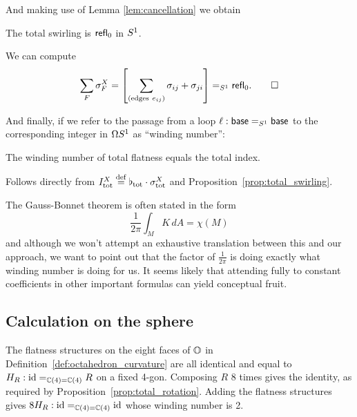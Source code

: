 And making use of Lemma \ref{lem:cancellation} we obtain
\begin{myprop}The total swirling is \( \mathsf{refl}_0 \) in \( S^1 \).\label{prop:total_swirling}
\end{myprop}
\begin{myproof}We can compute
\[\sum_F\sigma^X_F=\left[\sum_{(\mathrm{edges\ }e_{ij})}\sigma_{ij}+\sigma_{ji}\right]=_{\so}\refl_0.\qedhere\]
\end{myproof}

And finally, if we refer to the passage from a loop \( \ell:\mathsf{base}=_{S^1} \mathsf{base} \) to the corresponding integer in \( \Omega S^1 \) as ``winding number'':

\begin{mythm}\label{thm:total_index_total_curvature}The winding number of total flatness equals the total index.
\end{mythm}
\begin{myproof}
Follows directly from \( I^X_{\mathrm{tot}}\stackrel{\mathrm{def}}{=}\flat_{\mathrm{tot}}\cdot \sigma^X_{\mathrm{tot}} \) and Proposition~\ref{prop:total_swirling}.
\end{myproof}

\begin{mynote}
The Gauss-Bonnet theorem is often stated in the form \[\frac{1}{2\pi}\int_M K\,dA=\chi(M)\] and although we won't attempt an exhaustive translation between this and our approach, we want to point out that the factor of \( \frac{1}{2\pi} \) is doing exactly what winding number is doing for us. It seems likely that attending fully to constant coefficients in other important formulas can yield conceptual fruit.
\end{mynote}

\subsection{Calculation on the sphere}
The flatness structures on the eight faces of \( \mathbb{O} \) in Definition~\ref{def:octahedron_curvature} are all identical and equal to \( H_R:\text{id}=_{\mathbb{C}(4)=\mathbb{C}(4)}R \) on a fixed 4-gon. Composing \( R \) 8 times gives the identity, as required by Proposition~\ref{prop:total_rotation}. Adding the flatness structures gives \( 8H_R:\text{id}=_{\mathbb{C}(4)=\mathbb{C}(4)}\text{id} \) whose winding number is 2.


